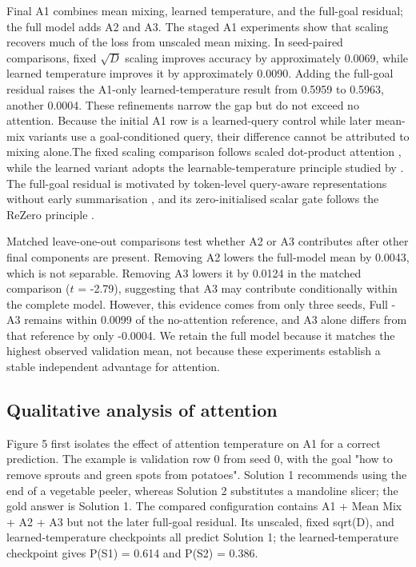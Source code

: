 \documentclass[11pt]{article}
\begin{document}
Final A1 combines mean mixing, learned temperature, and the full-goal residual; the full model adds A2 and A3. The staged A1 experiments show that scaling recovers much of the loss from unscaled mean mixing. In seed-paired comparisons, fixed $\sqrt{D}$ scaling improves accuracy by approximately 0.0069, while learned temperature improves it by approximately 0.0090. Adding the full-goal residual raises the A1-only learned-temperature result from 0.5959 to 0.5963, another 0.0004. These refinements narrow the gap but do not exceed no attention. Because the initial A1 row is a learned-query control while later mean-mix variants use a goal-conditioned query, their difference cannot be attributed to mixing alone.The fixed scaling comparison follows scaled dot-product attention \citep{vaswani2017attention}, while the learned variant adopts the learnable-temperature principle studied by \citet{dufter2020increasing}. The full-goal residual is motivated by token-level query-aware representations without early summarisation \citep{seo2017bidaf}, and its zero-initialised scalar gate follows the ReZero principle \citep{bachlechner2021rezero}.

Matched leave-one-out comparisons test whether A2 or A3 contributes after other final components are present. Removing A2 lowers the full-model mean by 0.0043, which is not separable. Removing A3 lowers it by 0.0124 in the matched comparison ($t$ = -2.79), suggesting that A3 may contribute conditionally within the complete model. However, this evidence comes from only three seeds, Full - A3 remains within 0.0099 of the no-attention reference, and A3 alone differs from that reference by only -0.0004. We retain the full model because it matches the highest observed validation mean, not because these experiments establish a stable independent advantage for attention.

\subsection{Qualitative analysis of attention}

Figure 5 first isolates the effect of attention temperature on A1 for a correct prediction. The example is validation row 0 from seed 0, with the goal "how to remove sprouts and green spots from potatoes". Solution 1 recommends using the end of a vegetable peeler, whereas Solution 2 substitutes a mandoline slicer; the gold answer is Solution 1. The compared configuration contains A1 + Mean Mix + A2 + A3 but not the later full-goal residual. Its unscaled, fixed sqrt(D), and learned-temperature checkpoints all predict Solution 1; the learned-temperature checkpoint gives P(S1) = 0.614 and P(S2) = 0.386.
\end{document}
